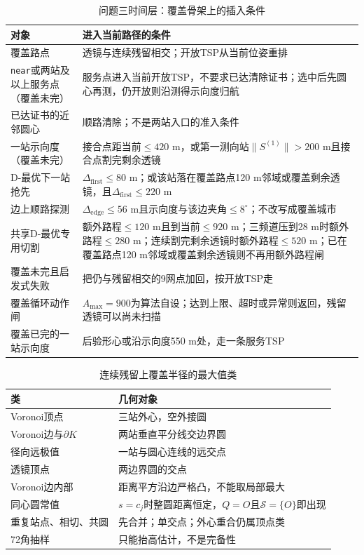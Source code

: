 \documentclass{cumcmthesis}
\begin{document}
\begin{table}[htbp]
\centering
\caption{问题三时间层：覆盖骨架上的插入条件}
\label{tab:q3insert}
\begin{tabular}{>{\raggedright\arraybackslash}p{}>{\raggedright\arraybackslash}p{}}
\toprule
对象 & 进入当前路径的条件 \\
\midrule
覆盖路点 & 透镜与连续残留相交；开放TSP从当前位姿重排 \\
\texttt{near}或两站及以上服务点（覆盖未完） & 服务点进入当前开放TSP，不要求已达清除证书；选中后先圆心再测，仍开放则沿测得示向度归航 \\
已达证书的近邻圆心 & 顺路清除；不是两站入口的准入条件 \\
一站示向度（覆盖未完） & 接合点距当前$\le 420$ m，或第一测向站$\|S^{(1)}\|>200$ m且接合点割完剩余透镜 \\
D-最优下一站抢先 & $\Delta_{\mathrm{first}}\le 80$ m；或该站落在覆盖路点120 m邻域或覆盖剩余透镜，且$\Delta_{\mathrm{first}}\le 220$ m \\
边上顺路探测 & $\Delta_{\mathrm{edge}}\le 56$ m且示向度与该边夹角$\le 8^\circ$；不改写成覆盖城市 \\
共享D-最优专用切割 & 额外路程$\le 120$ m且到当前$\le 920$ m；三频道压到28 m时额外路程$\le 280$ m；连续割完剩余透镜时额外路程$\le 520$ m；已在覆盖路点120 m邻域或覆盖剩余透镜则不再用额外路程闸 \\
覆盖未完且启发式失败 & 把仍与残留相交的9网点加回，按开放TSP走 \\
覆盖循环动作闸 & $A_{\max}=900$为算法自设；达到上限、超时或异常则返回，残留透镜可以尚未扫描 \\
覆盖已完的一站示向度 & 后验形心或沿示向度550 m处，走一条服务TSP \\
\bottomrule
\end{tabular}
\end{table}

\begin{table}[htbp]
\centering
\caption{连续残留上覆盖半径的最大值类}
\label{tab:q3rho}
\begin{tabular}{ll}
\toprule
类 & 几何对象 \\
\midrule
Voronoi顶点 & 三站外心，空外接圆 \\
Voronoi边与$\partial K$ & 两站垂直平分线交边界圆 \\
径向远极值 & 一站与圆心连线的远交点 \\
透镜顶点 & 两边界圆的交点 \\
Voronoi边内部 & 距离平方沿边严格凸，不能取局部最大 \\
同心圆常值 & $s=c_j$时整圆距离恒定，$Q=O$且$\mathcal{S}=\{O\}$即出现 \\
重复站点、相切、共圆 & 先合并；单交点；外心重合仍属顶点类 \\
72角抽样 & 只能抬高估计，不是完备性 \\
\bottomrule
\end{tabular}
\end{table}
\end{document}
